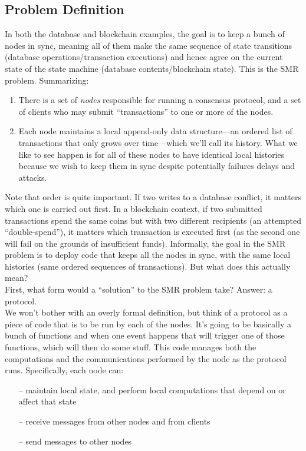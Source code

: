\subsection{Problem Definition}
In both the database and blockchain examples, the goal is to keep a bunch of nodes in
sync, meaning all of them make the same sequence of state transitions (database operations/transaction executions) and hence agree on the current state of the state machine
(database contents/blockchain state). This is the SMR problem. Summarizing:
\begin{enumerate}
    \item There is a set of \textit{nodes} responsible for running a consensus protocol, and a set of clients who may submit “transactions” to one or more of the nodes.
    \item Each node maintains a local append-only data structure—an ordered list of transactions that only grows over time—which we’ll call its history. What we like to see happen is for all of these nodes to have identical local histories because we wish to keep them in sync despite potentially failures delays and attacks.
\end{enumerate}


Note that order is quite important. If two writes to a database conflict, it matters which one is carried out first. In a blockchain context, if two submitted transactions spend the same coins but with two different recipients (an attempted “double-spend”), it matters which transaction is executed first (as the second one will fail on the grounds of insufficient funds).
Informally, the goal in the SMR problem is to deploy code that keeps all the nodes in
sync, with the same local histories (same ordered sequences of transactions). But what does this actually mean?\\
First, what form would a “solution” to the SMR problem take? Answer: a protocol.\\
We won’t bother with an overly formal definition, but think of a protocol as a piece of code
that is to be run by each of the nodes. It's going to
be basically a bunch of functions and when one event happens that will
trigger one of those functions, which 
will then do some stuff. This code manages both the computations and the
communications performed by the node as the protocol runs. Specifically, each node can:
\begin{itemize}
    \item[--]  maintain local state, and perform local computations that depend on or affect that state
    \item[--] receive messages from other nodes and from clients
    \item[--] send messages to other nodes
\end{itemize}


